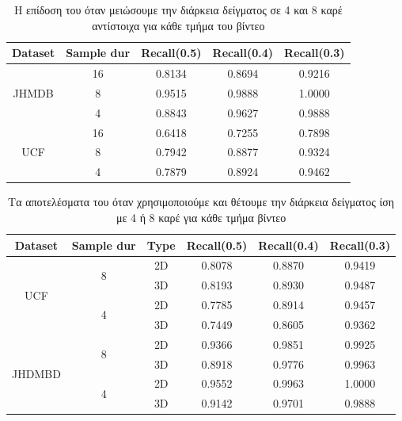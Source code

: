 \en
\begin{table}[h]
  \centering
  \begin{tabular}{|c | c || c c c|}
    \hline
    \textbf{Dataset} & \textbf{Sample dur} & \textbf{Recall(0.5)} &  \textbf{Recall(0.4)} &  \textbf{Recall(0.3)} \\
    \hline
    \multirow{3}{*}{JHMDB} & 16 & 0.8134 & 0.8694 & 0.9216 \\
    \cline{2-5}
    {} & 8 & 0.9515 & 0.9888 & 1.0000 \\
    \cline{2-5}
    {} & 4 & 0.8843 & 0.9627 & 0.9888 \\
    \hline
    \multirow{3}{*}{UCF} & 16 & 0.6418 & 0.7255 & 0.7898 \\
    \cline{2-5}
    {} & 8 & 0.7942 & 0.8877 & 0.9324\\
    \cline{2-5}
    {} & 4 & 0.7879 & 0.8924 & 0.9462 \\
    \hline
    
  \end{tabular}
  \caption{\gr Η επίδοση του  όταν μειώσουμε την διάρκεια δείγματος σε 4 και 8 καρέ αντίστοιχα για κάθε
  τμήμα του βίντεο}
  \label{table:gr_new_sample}
\end{table}
\gr
\en
\begin{table}[h]
  \centering
  \begin{tabular}{|c | c | c || c c c|}

    \hline
    \textbf{Dataset} & \textbf{Sample dur} & \textbf{Type} & \textbf{Recall(0.5)} &  \textbf{Recall(0.4)} &  \textbf{Recall(0.3)} \\
    \hline
    \multirow{4}{*}{UCF} & \multirow{2}{*}{8} & 2D & 0.8078 & 0.8870 & 0.9419 \\
    \cline{3-6}
    {} & {} & 3D & 0.8193 & 0.8930 & 0.9487 \\
    \cline{2-6}
    {} & \multirow{2}{*}{4}& 2D & 0.7785 & 0.8914 & 0.9457 \\
    \cline{3-6}
    {} & {} & 3D & 0.7449 & 0.8605 & 0.9362 \\
    \hline
    \multirow{4}{*}{JHDMBD} & \multirow{2}{*}{8} & 2D &  0.9366 & 0.9851 & 0.9925  \\
    \cline{3-6}
    {} & {} & 3D & 0.8918 & 0.9776 & 0.9963  \\ 
    \cline{2-6}
    {} & \multirow{2}{*}{4}& 2D & 0.9552 & 0.9963 & 1.0000 \\
    \cline{3-6}
    {} & {} & 3D & 0.9142 & 0.9701 & 0.9888  \\
    \hline
    
  \end{tabular}
  \caption{\gr Τα αποτελέσματα του  όταν χρησιμοποιούμε  και θέτουμε την διάρκεια
  δείγματος ίση με 4 ή 8 καρέ για κάθε τμήμα βίντεο}
  \label{table:gr_new_sample_reg}

\end{table}
\gr

